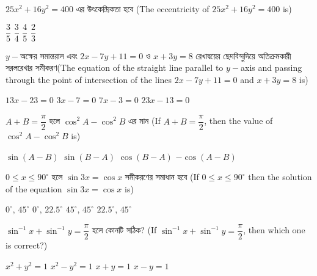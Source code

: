 \documentclass[addpoints]{exam}
\begin{document}
\begin{questions}
\begin{oneparchoices}
\end{oneparchoices}

\question  $ 25x^2 + 16y^2 = 400 $ এর উৎকেন্দ্রিকতা হবে (The eccentricity of $ 25x^2 + 16y^2 = 400 $ is)

\begin{oneparchoices}
\choice $ \dfrac{3}{5} $
\choice $ \dfrac{3}{4} $
\choice $ \dfrac{4}{5} $
\choice $ \dfrac{2}{3} $

\end{oneparchoices}

\question  $ y- $অক্ষের সমান্তরাল এবং $ 2x-7y+11=0 $ ও $ x+3y=8 $ রেখাদ্বয়ের ছেদবিন্দুদিয়ে অতিক্রমকারী সরলরেখার সমীকরণ(The equation of the straight line parallel to $y-$axis and passing through the point of intersection of the lines $ 2x-7y+11=0 $ and $ x+3y=8 $ is)

\begin{oneparchoices}
\choice $ 13x-23=0 $
\choice $ 3x-7=0 $
\choice $ 7x-3=0 $
\choice $ 23x-13=0 $

\end{oneparchoices}

\question $ A+B = \dfrac{\pi}{2} $  হলে $ \cos^{2}A - \cos^{2}B $ এর মান (If $ A+B = \dfrac{\pi}{2} $, then the value of $ \cos^{2}A - \cos^{2}B $ is)

\begin{oneparchoices}
\choice $ \sin (A-B) $
\choice $ \sin (B-A) $
\choice $ \cos (B-A) $
\choice $ -\cos (A-B) $

\end{oneparchoices}

\question  $ 0\le x\le 90^{\circ} $ হলে $ \sin 3x = \cos x $ সমীকরণের সমাধান হবে (If $ 0\le x\le 90^{\circ} $ then the solution of the equation $ \sin 3x = \cos x $ is)

\begin{oneparchoices}
\choice $ 0^{\circ},\, 45^{\circ} $
\choice $ 0^{\circ},\, 22.5^{\circ} $
\choice $ 45^{\circ},\,45^{\circ} $
\choice $ 22.5^{\circ},\, 45^{\circ}  $

\end{oneparchoices}

\question  $ \sin^{-1}x + \sin^{-1}y = \dfrac{\pi}{2} $ হলে কোনটি সঠিক? (If $ \sin^{-1}x + \sin^{-1}y = \dfrac{\pi}{2} $, then which one is correct?)

\begin{oneparchoices}
\choice $ x^2 + y^2 =1 $
\choice $ x^2 - y^2 =1 $
\choice $ x + y =1 $
\choice $ x-y=1  $

\end{oneparchoices}


\end{questions}
\end{document}
